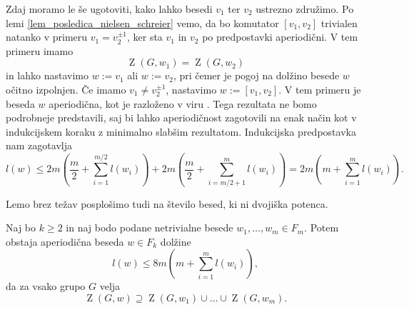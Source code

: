 \begin{dokaz}
        Zdaj moramo le še ugotoviti, kako lahko besedi $v_1$ ter $v_2$ ustrezno združimo. Po lemi \ref{lem_posledica_nielsen_schreier} vemo, da bo komutator $[v_1, v_2]$ trivialen natanko v primeru $v_1 = v_2^{\pm 1}$, ker sta $v_1$ in $v_2$ po predpostavki aperiodični. V tem primeru imamo \begin{equation*}
        \operatorname{Z}(G, w_1) = \operatorname{Z}(G, w_2)
        \end{equation*}  
         in lahko nastavimo $w := v_1$ ali $w := v_2$, pri čemer je pogoj na dolžino besede $w$ očitno izpolnjen. Če imamo $v_1 \neq v_2^{\pm 1}$, nastavimo $w := [v_1, v_2]$. V tem primeru je beseda $w$ aperiodična, kot je razloženo v viru \cite{Schutzenberger_1959}. Tega rezultata ne bomo podrobneje predstavili, saj bi lahko aperiodičnost
         zagotovili na enak način kot v indukcijskem koraku z minimalno slabšim rezultatom. Indukcijska predpostavka nam zagotavlja 
         \begin{equation*}
         l(w) \le 2m  \left(\frac{m}{2} + \sum_{i=1}^{m / 2} l(w_{i}) \right) + 2m \left(\frac{m}{2} + \sum_{i= m / 2 + 1}^{m} l(w_{i}) \right) = 2m \left( m + \sum_{i = 1}^{m} l(w_{i}) \right).
         \end{equation*}
    \end{dokaz}

Lemo brez težav posplošimo tudi na število besed, ki ni dvojiška potenca.
\begin{lema}
\label{lem_komutatorska_lema_splosna}
Naj bo $k \ge 2$ in naj bodo podane netrivialne besede $w_1, \ldots, w_{m} \in  F_m$. Potem obstaja aperiodična beseda $w \in F_k$ dolžine \begin{equation*}
l(w) \le 8m \left(m +  \sum_{i = 1}^{m} l(w_{i}) \right),
\end{equation*}  
da za vsako grupo $G$ velja \begin{equation*}
\operatorname{Z}(G, w) \supseteq \operatorname{Z}(G, w_1) \cup \ldots \cup  \operatorname{Z}(G, w_{m}).
\end{equation*}    
\end{lema}


